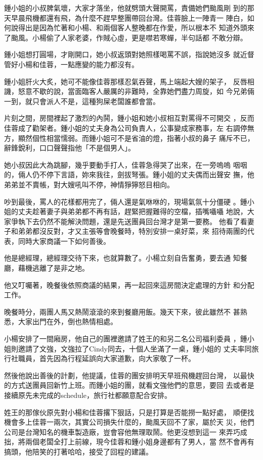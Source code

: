 鍾小姐的小叔脾氣壞，大家才落坐，他就劈頭大聲開罵，責備她們颱風剛
到的那天早晨飛機都還有飛，為什麼不趕早整團帶回台灣。佳蓉臉上一陣青一
陣白，如何說得出是因為忙著和小楊、和兩個客人整晚都在作愛，所以根本不
知道外頭來了颱風。小楊偷了人家老婆，作賊心虛，更是噤若寒蟬，半句話都
不敢分辯。

鍾小姐想打圓場，才剛開口，她小叔返頭對她照樣喝罵不誤，指說她沒多
就近督管好小楊和佳蓉，一點應變的能力都沒有。

鍾小姐肝火大炙，她可不能像佳蓉那樣忍氣吞聲，馬上端起大嫂的架子，
反唇相譏，怒意不歇的說，當面臨客人嚴厲的非難時，全靠她們盡力周旋，如
今兄弟倆一到，就只會派人不是，這種狗屎老闆誰都會當。

片刻之間，房間裡起了激烈的內鬨，鍾小姐和她小叔相互對罵得不可開交
，反而佳蓉成了勸架者。鍾小姐的丈夫身為公司負責人，公事變成家務事，左
右調停無方，顯然個性相當懦弱。而鍾小姐可不是省油的燈，指著小叔的鼻子
痛斥不已，辭鋒銳利，口口聲聲指他「不是個男人」。

她小叔因此大為跳腳，幾乎要動手打人，佳蓉急得哭了出來，在一旁嗚嗚
咽咽的，倆人仍不停下言語，妳來我往，劍拔弩張。鍾小姐的丈夫偶而出聲安
撫，他弟弟並不賣帳，對大嫂吼叫不停，神情猙獰怒目相向。

吵到最後，罵人的花樣都用完了，倆人還是氣咻咻的，現場氣氛十分僵硬
。鍾小姐的丈夫趁著妻子與弟弟都不再有話，趕緊把握難得的空檔，插嘴囁囁
地說，大家爭執下去仍然不能解決問題，還是先送團員回台灣才是第一要務。
他看了看妻子和弟弟都沒反對，才又主張等會晚餐時，特別安排一桌好菜，來
招待兩團的代表，同時大家商議一下如何善後。

他是總經理，總經理交待下來，也就算數了。小楊立刻自告奮勇，要去通
知餐廳，藉機逃離了是非之地。

他又叮囑著，晚餐後依照商議的結果，再一起回來這房間決定處理的方針
和分配工作。

晚餐時分，兩團人馬又熱鬧滾滾的來到餐廳用飯。幾天下來，彼此雖然不
甚熟悉，大家出門在外，倒也熱情相處。

小楊安排了一間廂房，他自己的團裡邀請了姓王的和另二名公司福利委員
，鍾小姐則邀請了文強，文強拉了Cindy同去，十個人坐滿了一桌，鍾小姐的
丈夫率同旅行社職員，首先因為行程延誤向大家道歉，向大家敬了一杯。

然後他說出善後的計劃，他提議，佳蓉的團安排明天早班飛機趕回台灣，
以最快的方式送團員回新竹上班。而鍾小姐的團，就看文強他們的意思，要回
去或者是接續原先未完成的schedule，旅行社都願意配合安排。

姓王的那傢伙原先對小楊和佳蓉撂下狠話，只是打算是否能撈一點好處，
順便找機會多上佳蓉一兩次，其實公司損失什麼的，颱風天回不了家，屬於天
災，他們公司是台灣知名的機車製造廠，豈會容他無理取鬧。他更沒想到這一
來弄巧成拙，將兩個老闆全打上前線，現今佳蓉和鍾小姐身邊都有了男人，當
然不會再有搞頭，他陪笑的打著哈哈，接受了回程的建議。

